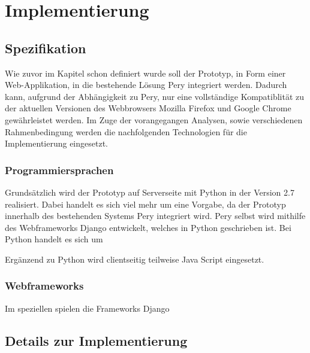 \documentclass[Bachelorarbeit.tex]{subfiles}
\begin{document}
\chapter{Implementierung}
\label{chap:implementierung}

\section{Spezifikation}
\label{chap:implementierung:sec:spezifikation}
Wie zuvor im Kapitel  schon definiert wurde soll der Prototyp, in Form einer Web-Applikation, in die bestehende Lösung Pery integriert werden.
Dadurch kann, aufgrund der Abhängigkeit zu Pery, nur eine vollständige Kompatiblität zu der aktuellen Versionen des Webbrowsers Mozilla Firefox und Google Chrome gewährleistet werden.   
Im Zuge der vorangegangen Analysen, sowie verschiedenen Rahmenbedingung werden die nachfolgenden Technologien für die Implementierung eingesetzt. 

\subsection*{Programmiersprachen}
Grundsätzlich wird der Prototyp auf Serverseite mit Python in der Version 2.7 realisiert. 
Dabei handelt es sich viel mehr um eine Vorgabe, da der Prototyp innerhalb des bestehenden Systems Pery integriert wird. Pery selbst wird mithilfe des Webframeworks Django entwickelt, welches in Python geschrieben ist.
Bei Python handelt es sich um 

Ergänzend zu Python wird clientseitig teilweise Java Script eingesetzt. 

\subsection*{Webframeworks}
Im speziellen spielen die Frameworks Django 


\section{Details zur Implementierung}
\label{chap:implementierung:sec:details}
\end{document}
